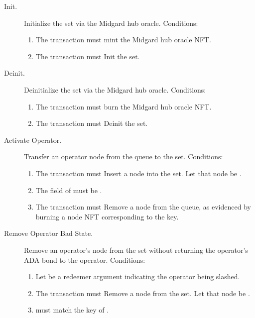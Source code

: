 \documentclass[../midgard.tex]{subfiles}
\begin{document}
\begin{description}
    \item[Init.] Initialize the  set via the Midgard hub oracle.
      Conditions:
        \begin{enumerate}
            \item The transaction must mint the Midgard hub oracle NFT.
            \item The transaction must Init the  set.
        \end{enumerate}
    \item[Deinit.] Deinitialize the  set via the Midgard hub oracle.
      Conditions:
        \begin{enumerate}
            \item The transaction must burn the Midgard hub oracle NFT.
            \item The transaction must Deinit the  set.
        \end{enumerate}
    \item[Activate Operator.] Transfer an operator node from the  queue to the  set.
      Conditions:
        \begin{enumerate}
            \item The transaction must Insert a node into the  set.
              Let that node be .
            \item The  field of  must be .
            \item The transaction must Remove a node from the  queue, as evidenced by burning a  node NFT corresponding to the  key.
        \end{enumerate}
    \item[Remove Operator Bad State.] Remove an operator's node from the  set without returning the operator's ADA bond to the operator.
      Conditions:
        \begin{enumerate}
            \item Let  be a redeemer argument indicating the operator being slashed.
            \item The transaction must Remove a node from the  set.
              Let that node be .
            \item {} must match the key of .

\end{enumerate}
\end{description}
\end{document}
